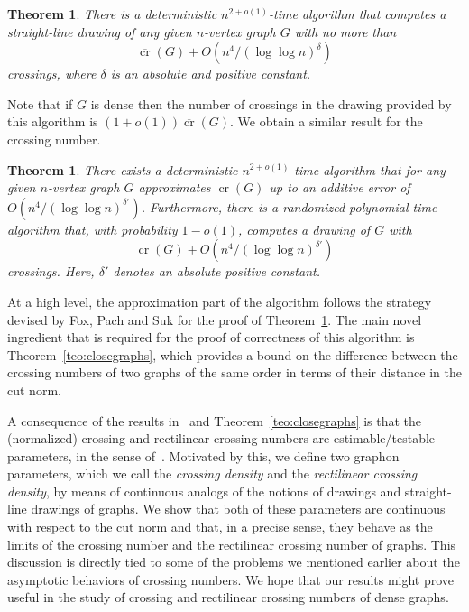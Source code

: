 \documentclass{article}
\newcounter{contSect} \numberwithin{contSect}{section}
\newtheorem{theorem}[contSect]{Theorem}
\begin{document}
\begin{theorem}\label{teo:FoxPachSuk}
    There is a deterministic $n^{2+o(1)}$-time algorithm that computes a straight-line drawing of any given $n$-vertex graph $G$ with no more than \[\overline{\mathop{\mathrm{cr}}}(G)+O(n^4/(\log\log n)^\delta)\] crossings, where $\delta$ is an absolute and positive constant.
\end{theorem}

Note that if $G$ is dense then the number of crossings in the drawing provided by this algorithm is $(1+o(1))\overline{\mathop{\mathrm{cr}}}(G)$. We obtain a similar result for the crossing number.

\begin{theorem}\label{teo:main}
    There exists a deterministic $n^{2+o(1)}$-time algorithm that for any given  $n$-vertex graph $G$ approximates $\mathop{\mathrm{cr}}(G)$ up to an additive error of $O(n^4/(\log\log n)^{\delta'})$. Furthermore, there is a randomized polynomial-time algorithm that, with probability $1-o(1)$, computes a drawing of $G$ with \[\mathop{\mathrm{cr}}(G)+O(n^4/(\log\log n)^{\delta'})\] crossings. Here, $\delta'$ denotes an absolute positive constant.
\end{theorem}


At a high level, the approximation part of the algorithm follows the strategy devised by Fox, Pach and Suk for the proof of Theorem~\ref{teo:FoxPachSuk}. The main novel ingredient that is required for the proof of correctness of this algorithm is Theorem~\ref{teo:closegraphs}, which provides a bound on the difference between the crossing numbers of two graphs of the same order in terms of their distance in the cut norm.

A consequence of the results in~\cite{approximatingrect} and Theorem~\ref{teo:closegraphs} is that the (normalized) crossing and rectilinear crossing numbers are estimable/testable parameters, in the sense of~\cite{borgslimits}. Motivated by this, we define two graphon parameters, which we call the \textit{crossing density} and the \textit{rectilinear crossing density}, by means of continuous analogs of the notions of drawings and straight-line drawings of graphs. We show that both of these parameters are continuous with respect to the cut norm and that, in a precise sense, they behave as the limits of the crossing number and the rectilinear crossing number of graphs. This discussion is directly tied to some of the problems we mentioned earlier about the asymptotic behaviors of crossing numbers. We hope that our results might prove useful in the study of crossing and rectilinear crossing numbers of dense graphs.
\end{document}
